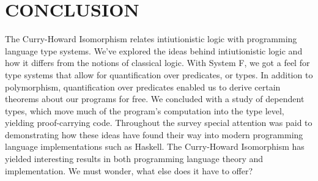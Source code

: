 \chapter{CONCLUSION}
The Curry-Howard Isomorphism relates intiutionistic logic with programming language type systems.
We've explored the ideas behind intiutionistic logic and how it differs from the notions of classical logic.
With System F, we got a feel for type systems that allow for quantification over predicates, or types.
In addition to polymorphism, quantification over predicates enabled us to derive certain theorems about our programs for free.
We concluded with a study of dependent types, which move much of the program's computation into the type level, yielding proof-carrying code.
Throughout the survey special attention was paid to demonstrating how these ideas have found their way into modern programming language implementations such as Haskell.
The Curry-Howard Isomorphism has yielded interesting results in both programming language theory and implementation. We must wonder, what else does it have to offer?
